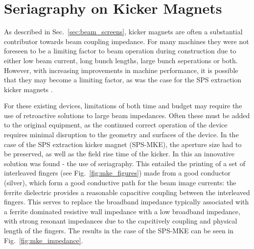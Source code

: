 \section{Seriagraphy on Kicker Magnets}
\label{sec:seriagraphy}

As described in Sec.~\ref{sec:beam_screens}, kicker magnets are often a substantial contributor towards beam coupling impedance. For many machines they were not foreseen to be a limiting factor to beam operation during construction due to either low beam current, long bunch lengths, large bunch seperations or both. However, with increasing improvements in machine performance, it is possible that they may become a limiting factor, as was the case for the SPS extraction kicker magnets \cite{Kroyer:MKEReduct}. 

For these existing devices, limitations of both time and budget may require the use of retroactive solutions to large beam impedances. Often these must be added to the original equipment, as the continued correct operation of the device requires minimal disruption to the geometry and surfaces of the device. In the case of the SPS extraction kicker magnet (SPS-MKE), the aperture size had to be preserved, as well as the field rise time of the kicker. In this an innovative solution was found - the use of seriagraphy. This entailed the printing of a set of interleaved fingers (see Fig.~\ref{fig:mke_figures}) made from a good conductor (silver), which form a good conductive path for the beam image currents: the ferrite dielectric provides a reasonable capacitive coupling between the interleaved fingers. This serves to replace the broadband impedance typically associated with a ferrite dominated resistive wall impedance with a low broadband impedance, with strong resonant impedances due to the capcitively coupling and physical length of the fingers. The results in the case of the SPS-MKE can be seen in Fig.~\ref{fig:mke_impedance}.


